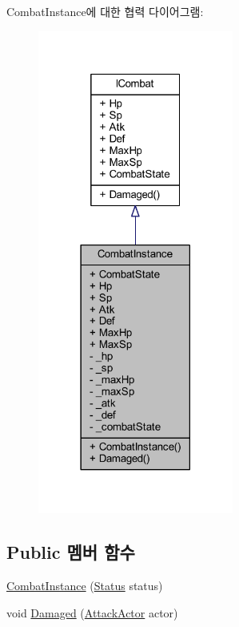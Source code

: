 Combat\+Instance에 대한 협력 다이어그램\+:
\nopagebreak
\begin{figure}[H]
\begin{center}
\leavevmode
\includegraphics[width=182pt]{class_combat_instance__coll__graph}
\end{center}
\end{figure}
\subsection*{Public 멤버 함수}
\begin{DoxyCompactItemize}
\item 
\hyperlink{class_combat_instance_a613a6f5a211954d3f5f0d621cab88606}{Combat\+Instance} (\hyperlink{struct_status}{Status} status)
\item 
void \hyperlink{class_combat_instance_a612a867750ddfc0da7306e73752225b7}{Damaged} (\hyperlink{class_attack_actor}{Attack\+Actor} actor)
\end{DoxyCompactItemize}
